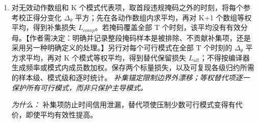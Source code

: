 \documentclass[10pt,a4paper]{article}
\begin{document}
\begin{enumerate}[leftmargin=*,start=4]
  \item 对无效动作数组和 K 个模式代表项，取首段违规掩码之外的时刻，将每个参考校正得分变化 \(\Delta _\theta \) 平方；先在各动作数组内求平均，再对 K+1 个数组等权平均，得到补集损失 \(L_{comp}\)。若掩码覆盖全部 T 个时刻，该平均没有有效分母。【作者需决定：明确并记录整段掩码样本是被排除、不贡献补集项，还是采用另一种明确定义的处理。】另行对每个可行模式在全部 T 个时刻的 \(\Delta _\theta \) 平方求平均，再对 K 个模式等权平均，得到替代保留损失 \(L_{alt}\)；不得按编译器生成频率或模式内成员数加权。保存两个标量损失，以及可复现各级归约所需的样本级、模式级和逐时统计。
\noindent\emph{补集锚定限制边界外漂移；等权替代项逐一保护所有可行模式，而非只保护主导模式。}
\par{}
\par\emph{为什么：} 补集项防止时间信用泄漏，替代项使压制少数可行模式变得有代价，即使平均有效性提高。
\end{enumerate}
\end{document}
